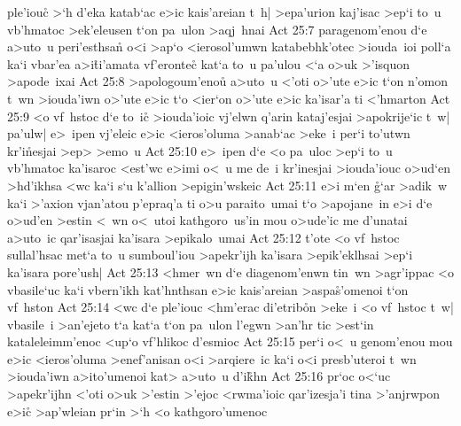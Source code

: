ple'iouc\r{}
>`h
d'eka
katab`ac
e>ic
kais'areian
t~h|
>epa'urion
kaj'isac
>ep`i
to~u
vb'hmatoc
>ek'eleusen
t`on
pa~ulon
>aqj~hnai\bibvsend
\vs Act 25:7
paragenom'enou
d`e
a>uto~u
peri'esthsa\r{n}
o<i
>ap`o
<ierosol'umwn
katabebhk'otec
>iouda~ioi
poll`a
ka`i
vbar'ea
a>i\r{t}i'amata
vf'erontec\r{}
kat`a
to~u
pa'ulou
<`a
o>uk
>'isquon
>apode~ixai\bibvsend
\vs Act 25:8
>apologoum'enou\r{}
a>uto~u
<'oti
o>'ute
e>ic
t`on
n'omon
t~wn
>iouda'iwn
o>'ute
e>ic
t`o
<ier`on
o>'ute
e>ic
ka'isar'a
ti
<'hmarton\bibvsend
\vs Act 25:9
<o
vf~hstoc
d`e
to~ic\r{}
>iouda'ioic
vj'elwn
q'arin
kataj'esjai
>apokrije`ic
t~w|
pa'ulw|
e>~ipen
vj'eleic
e>ic
<ieros'oluma
>anab`ac
>eke~i
per`i
to'utwn
kr'i\r{n}esjai
>ep>
>emo~u\bibvsend
\vs Act 25:10
e>~ipen
d`e
<o
pa~uloc
>ep`i
to~u
vb'hmatoc
ka'isaroc
<est'wc
e>imi
o<~u
me
de~i
kr'inesjai
>iouda'iouc
o>ud`en
>hd'ikhsa
<wc
ka`i
s`u
k'allion
>epigin'wskeic\bibvsend
\vs Act 25:11
e>i
m`en
\r{g}`ar
>adik~w
ka`i
>'axion
vjan'atou
p'epraq'a
ti
o>u
paraito~umai
t`o
>apojane~in
e>i
d`e
o>ud'en
>estin
<~wn
o<~utoi
kathgoro~us'in
mou
o>ude'ic
me
d'unatai
a>uto~ic
qar'isasjai
ka'isara
>epikalo~umai\bibvsend
\vs Act 25:12
t'ote
<o
vf~hstoc
sullal'hsac
met`a
to~u
sumboul'iou
>apekr'ijh
ka'isara
>epik'eklhsai
>ep`i
ka'isara
pore'ush|\bibvsend
\vs Act 25:13
<hmer~wn
d`e
diagenom'enwn
tin~wn
>agr'ippac
<o
vbasile`uc
ka`i
vbern'ikh
kat'hnthsan
e>ic
kais'areian
>aspa\r{s}'omenoi
t`on
vf~hston\bibvsend
\vs Act 25:14
<wc
d`e
ple'iouc
<hm'erac
di'etrib\r{o}n
>eke~i
<o
vf~hstoc
t~w|
vbasile~i
>an'ejeto
t`a
kat`a
t`on
pa~ulon
l'egwn
>an'hr
tic
>est`in
kataleleimm'enoc
<up`o
vf'hlikoc
d'esmioc\bibvsend
\vs Act 25:15
per`i
o<~u
genom'enou
mou
e>ic
<ieros'oluma
>enef'anisan
o<i
>arqiere~ic
ka`i
o<i
presb'uteroi
t~wn
>iouda'iwn
a>ito'umenoi
kat>
a>uto~u
d'i\r{k}hn\bibvsend
{}
\vs Act 25:16
pr`oc
o<`uc
>apekr'ijhn
<'oti
o>uk
>'estin
>'ejoc
<rwma'ioic
qar'izesja'i
tina
>'anjrwpon
e>ic\r{}
>ap'wleian
pr`in
>`h
<o
kathgoro'umenoc
